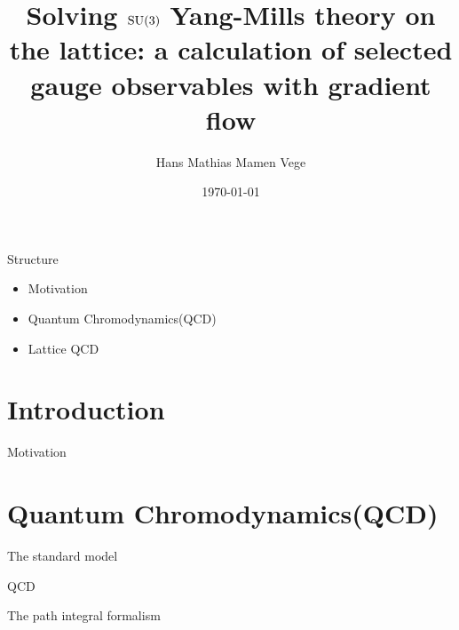 \documentclass[10pt]{beamer}
\title{Solving \texorpdfstring{$\mathrm{SU}(3)$}{SU3} Yang-Mills theory on the lattice: a calculation of selected gauge observables with gradient flow}
\date{\today}
\author{Hans Mathias Mamen Vege}
\institute{University of Oslo}
\begin{document}
\maketitle


\begin{frame}{Structure}
    \begin{itemize}[<+->]
        \item Motivation
        \item Quantum Chromodynamics(QCD) %
        \item Lattice QCD 
    \end{itemize}
\end{frame}

\section{Introduction}

\begin{frame}{Motivation}
\end{frame}

\section{Quantum Chromodynamics(QCD)}

\begin{frame}{The standard model}
\end{frame}

\begin{frame}{QCD}
\end{frame}

\begin{frame}{The path integral formalism}
\end{frame}
\end{document}
